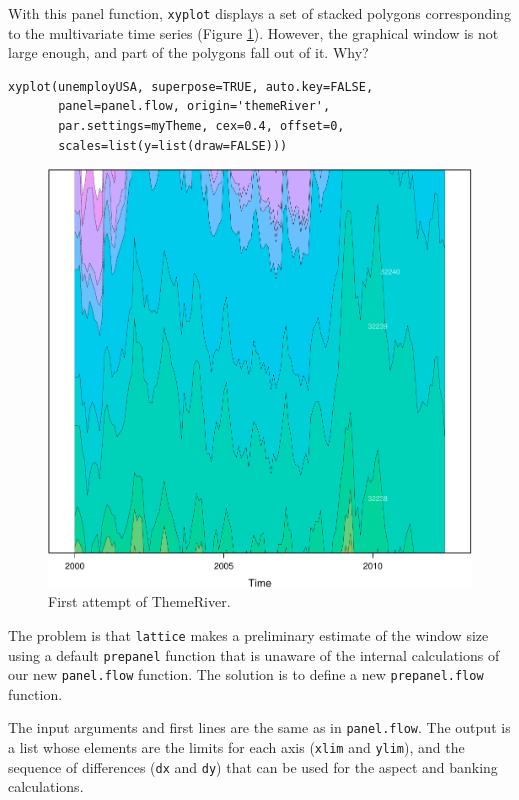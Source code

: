 \documentclass[smallroyalvopaper]{memoir}
\begin{document}
With this panel function, \texttt{xyplot} displays a set of stacked
polygons corresponding to the multivariate time series (Figure
\ref{fig:themeRiverError}). However, the graphical window is not
large enough, and part of the polygons fall out of it. Why?

\lstset{language=R,numbers=none}
\begin{lstlisting}
xyplot(unemployUSA, superpose=TRUE, auto.key=FALSE,
       panel=panel.flow, origin='themeRiver',
       par.settings=myTheme, cex=0.4, offset=0,
       scales=list(y=list(draw=FALSE)))
\end{lstlisting}

\begin{figure}[htb]
\centering
\includegraphics[height=0.45\textheight]{figs/ThemeRiverError.pdf}
\caption{\label{fig:themeRiverError}First attempt of ThemeRiver.}
\end{figure}

The problem is that \texttt{lattice} makes a preliminary estimate of the
window size using a default \texttt{prepanel} function that is unaware of the
internal calculations of our new \texttt{panel.flow} function. The solution
is to define a new \texttt{prepanel.flow} function. 

The input arguments and first lines are the same as in
\texttt{panel.flow}. The output is a list whose elements are the limits for
each axis (\texttt{xlim} and \texttt{ylim}), and the sequence of differences (\texttt{dx}
and \texttt{dy}) that can be used for the aspect and banking
calculations. 
\end{document}

